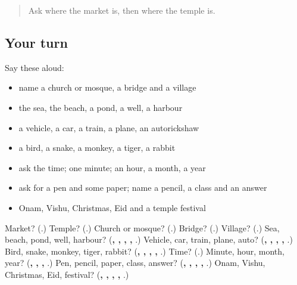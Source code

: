 \label{lesson:ML-R141-second-pass-town-travel-time}



\begin{quote}
Ask where the market is, then where the temple is.
\end{quote}

\subsection*{Your turn}
Say these aloud:

\begin{itemize}
\raggedright
  \item name a church or mosque, a bridge and a village
  \item the sea, the beach, a pond, a well, a harbour
  \item a vehicle, a car, a train, a plane, an autorickshaw
  \item a bird, a snake, a monkey, a tiger, a rabbit
  \item ask the time; one minute; an hour, a month, a year
  \item ask for a pen and some paper; name a pencil, a class and an answer
  \item Onam, Vishu, Christmas, Eid and a temple festival
\end{itemize}

\begin{tcolorbox}[breakable,colback=teal!4,colframe=teal!35!black,title={Before you move on}]
Market? (\textbf{}.) Temple? (\textbf{}.) Church or mosque? (\textbf{}.) Bridge? (\textbf{}.) Village? (\textbf{}.) Sea, beach, pond, well, harbour? (\textbf{, , , , }.) Vehicle, car, train, plane, auto? (\textbf{, , , , }.) Bird, snake, monkey, tiger, rabbit? (\textbf{, , , , }.) Time? (\textbf{}.) Minute, hour, month, year? (\textbf{, , , }.) Pen, pencil, paper, class, answer? (\textbf{, , , , }.) Onam, Vishu, Christmas, Eid, festival? (\textbf{, , , , }.)
\end{tcolorbox}
